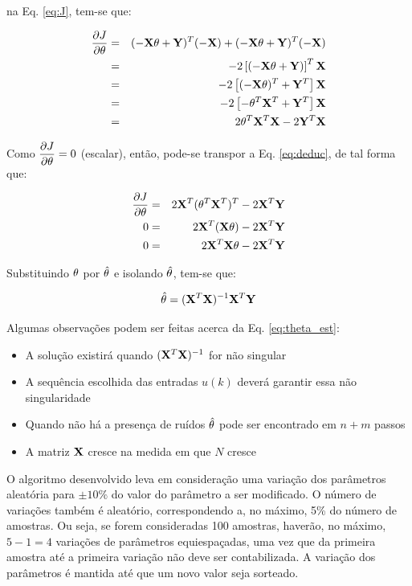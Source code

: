 \noindent na Eq. \ref{eq:J}, tem-se que:

\begin{eqnarray}
\frac{\partial J}{\partial \mathbf{\theta}} & = & 
(-\mathbf{X\theta}+\mathbf{Y})^T(-\mathbf{X}) + (-\mathbf{X\theta}+\mathbf{Y})^T(-\mathbf{X})\nonumber\\
& = & -2 \left[(-\mathbf{X\theta}+\mathbf{Y})\right]^T\mathbf{X}\nonumber\\
& = & -2 \left[(-\mathbf{X\theta})^T + \mathbf{Y}^T\right]\mathbf{X}\nonumber\\
& = & -2 \left[-\mathbf{\theta}^T\mathbf{X}^T + \mathbf{Y}^T\right]\mathbf{X}\nonumber\\
& = & 2 \mathbf{\theta}^T\mathbf{X}^T\mathbf{X} -2 \mathbf{Y}^T\mathbf{X}\label{eq:deduc}
\end{eqnarray}

Como $\displaystyle\frac{\partial J}{\partial \mathbf{\theta}} = 0$ (escalar), então,
pode-se transpor a Eq. \ref{eq:deduc}, de tal forma que:

\begin{eqnarray}
\frac{\partial J}{\partial \mathbf{\theta}} & = & 
2\mathbf{X}^T(\mathbf{\theta}^T\mathbf{X}^T)^T - 2\mathbf{X}^T\mathbf{Y}\nonumber\\
0 & = & 2\mathbf{X}^T(\mathbf{X\theta}) - 2\mathbf{X}^T\mathbf{Y}\nonumber\\
0 & = & 2\mathbf{X}^T\mathbf{X\theta} - 2\mathbf{X}^T\mathbf{Y}
\end{eqnarray}

Substituindo $\mathbf{\theta}$ por $\hat{\mathbf{\theta}}$ e isolando
$\hat{\mathbf{\theta}}$, tem-se que:

\begin{equation}\label{eq:theta_est}
\hat{\mathbf{\theta}} = (\mathbf{X}^T\mathbf{X})^{-1} \mathbf{X}^T\mathbf{Y}
\end{equation}

Algumas observações podem ser feitas acerca da Eq. \ref{eq:theta_est}:

\begin{itemize}
    \item A solução existirá quando $(\mathbf{X}^T\mathbf{X})^{-1}$ for não singular
    \item A sequência escolhida das entradas $u(k)$ deverá garantir essa
          não singularidade
    \item Quando não há a presença de ruídos $\hat{\mathbf{\theta}}$ pode ser
          encontrado em $n+m$ passos
    \item A matriz $\mathbf{X}$ cresce na medida em que $N$ cresce
\end{itemize}

O algoritmo desenvolvido leva em consideração uma variação dos parâmetros
aleatória para $\pm 10\%$ do valor do parâmetro a ser modificado. O número de
variações também é aleatório, correspondendo a, no máximo, 5\% do número de
amostras. Ou seja, se forem consideradas 100 amostras, haverão, no máximo, $5-1
= 4$ variações de parâmetros equiespaçadas, uma vez que da primeira amostra até
a primeira variação não deve ser contabilizada. A variação dos parâmetros é
mantida até que um novo valor seja sorteado.

